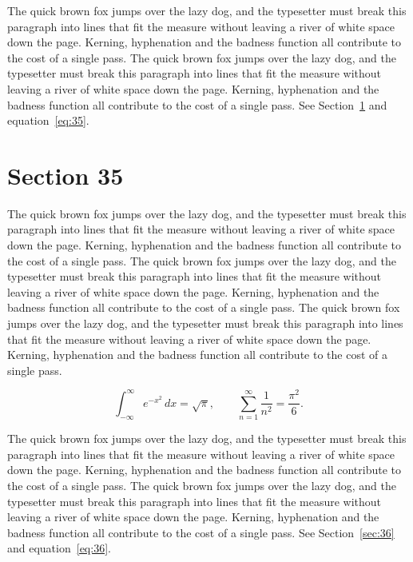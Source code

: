 \documentclass{article}
\begin{document}
The quick brown fox jumps over the lazy dog, and the typesetter must break this paragraph into lines that fit the measure without leaving a river of white space down the page. Kerning, hyphenation and the badness function all contribute to the cost of a single pass. The quick brown fox jumps over the lazy dog, and the typesetter must break this paragraph into lines that fit the measure without leaving a river of white space down the page. Kerning, hyphenation and the badness function all contribute to the cost of a single pass. 
See Section~\ref{sec:35} and equation~\eqref{eq:35}.
\section{Section 35}
\label{sec:35}
The quick brown fox jumps over the lazy dog, and the typesetter must break this paragraph into lines that fit the measure without leaving a river of white space down the page. Kerning, hyphenation and the badness function all contribute to the cost of a single pass. The quick brown fox jumps over the lazy dog, and the typesetter must break this paragraph into lines that fit the measure without leaving a river of white space down the page. Kerning, hyphenation and the badness function all contribute to the cost of a single pass. The quick brown fox jumps over the lazy dog, and the typesetter must break this paragraph into lines that fit the measure without leaving a river of white space down the page. Kerning, hyphenation and the badness function all contribute to the cost of a single pass. 

\begin{equation}\label{eq:35}
\int_{-\infty}^{\infty} e^{-x^{2}}\,dx = \sqrt{\pi}, \qquad
\sum_{n=1}^{\infty} \frac{1}{n^{2}} = \frac{\pi^{2}}{6}.
\end{equation}

The quick brown fox jumps over the lazy dog, and the typesetter must break this paragraph into lines that fit the measure without leaving a river of white space down the page. Kerning, hyphenation and the badness function all contribute to the cost of a single pass. The quick brown fox jumps over the lazy dog, and the typesetter must break this paragraph into lines that fit the measure without leaving a river of white space down the page. Kerning, hyphenation and the badness function all contribute to the cost of a single pass. 
See Section~\ref{sec:36} and equation~\eqref{eq:36}.
\end{document}
